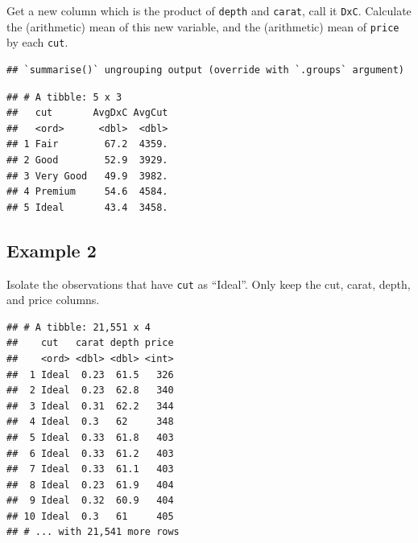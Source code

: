 \documentclass[
]{book}
\newenvironment{Shaded}{\begin{snugshade}}{\end{snugshade}}
\newcommand{\DataTypeTok}[1]{\textcolor[rgb]{0.13,0.29,0.53}{#1}}
\newcommand{\KeywordTok}[1]{\textcolor[rgb]{0.13,0.29,0.53}{\textbf{#1}}}
\newcommand{\NormalTok}[1]{#1}
\newcommand{\OperatorTok}[1]{\textcolor[rgb]{0.81,0.36,0.00}{\textbf{#1}}}
\newcommand{\StringTok}[1]{\textcolor[rgb]{0.31,0.60,0.02}{#1}}
\begin{document}
Get a new column which is the product of \texttt{depth} and \texttt{carat}, call it \texttt{DxC}. Calculate the (arithmetic) mean of this new variable, and the (arithmetic) mean of \texttt{price} by each \texttt{cut}.

\begin{Shaded}
\end{Shaded}

\begin{verbatim}
## `summarise()` ungrouping output (override with `.groups` argument)
\end{verbatim}

\begin{verbatim}
## # A tibble: 5 x 3
##   cut       AvgDxC AvgCut
##   <ord>      <dbl>  <dbl>
## 1 Fair        67.2  4359.
## 2 Good        52.9  3929.
## 3 Very Good   49.9  3982.
## 4 Premium     54.6  4584.
## 5 Ideal       43.4  3458.
\end{verbatim}

\hypertarget{example-2-1}{%
\subsection{Example 2}\label{example-2-1}}

Isolate the observations that have \texttt{cut} as ``Ideal''. Only keep the cut, carat, depth, and price columns.

\begin{Shaded}
\end{Shaded}

\begin{verbatim}
## # A tibble: 21,551 x 4
##    cut   carat depth price
##    <ord> <dbl> <dbl> <int>
##  1 Ideal  0.23  61.5   326
##  2 Ideal  0.23  62.8   340
##  3 Ideal  0.31  62.2   344
##  4 Ideal  0.3   62     348
##  5 Ideal  0.33  61.8   403
##  6 Ideal  0.33  61.2   403
##  7 Ideal  0.33  61.1   403
##  8 Ideal  0.23  61.9   404
##  9 Ideal  0.32  60.9   404
## 10 Ideal  0.3   61     405
## # ... with 21,541 more rows
\end{verbatim}
\end{document}
